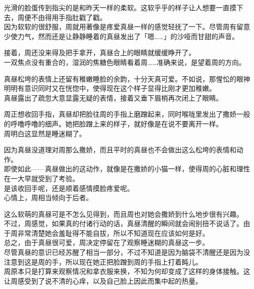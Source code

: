 光滑的脸蛋传到指尖的是和昨天一样的柔软。这软乎乎的样子让人想要一直摸下去，周便不由得用手指肚戳了戳。\\

因为软软的很舒服，周就用著像是疼爱真昼一样的感觉轻抚了一下。尽管周有留意少使力气，然而还是让静静睡着的真昼发出了「嗯……」的沙哑而甘甜的声音。

接着，周还没来得及把手拿开，真昼合上的眼睛就缓缓睁开了。\\

一双焦点没有重合的，湿润的焦糖色眼睛看着周……准确来说，是望着周的方向。

真昼松垮的表情上还留有稚嫩睡脸的余韵，十分天真可爱。不如说，那惺忪的眼神明明有意识同时又在恍惚中，使得现在这个样子显得比刚才更加稚嫩。\\

真昼露出了疏忽大意显露无疑的表情，接着又垂下眉梢再次闭上了眼睛。

周正想收回手指，真昼却把脸往周的手指上磨蹭起来，同时喉咙里发出了撒娇一般的呼噜呼噜的细声。她把脸蹭上来的样子，就好像是在说不要离开一样。\\

周明白这显然是睡迷糊了。

因为真昼没道理对周那么撒娇，而且平时的真昼也不会做出这么松垮的表情和动作。\\

即使如此——真昼做出的这动作，就像是在撒娇的小猫一样，使得周的心脏和理性在一大早就受到了考验。\\

是该收回手呢，还是顺着感情摸脸疼爱呢。\\

心情上，周相当倾向于后者。

这么软萌的真昼可是不怎么见得到，而且周也对她会撒娇到什么地步很有兴趣。\\

不过，周感觉，如果真的付诸行动的话，真昼清醒的瞬间就会闹别扭不说话了。由于周非常清楚她会羞耻得不能自拔，所以不知道现在应该如何是好。\\

总之，由于真昼很可爱，周决定停留在了观察睡迷糊的真昼这一步。\\

尽管真昼的意识已经苏醒了相当一部分，不过不知道是因为脑袋不清醒还是因为没注意到这是周的手，所以现在她正把脸蹭到周的手指上打着盹儿。\\

周原本只是打算来观察情况和拿衣服来换，不知为何却变成了这样的身体接触。这让周感受到了说不清的心痒，以及自己脸上因此而集中起的热量。\\

